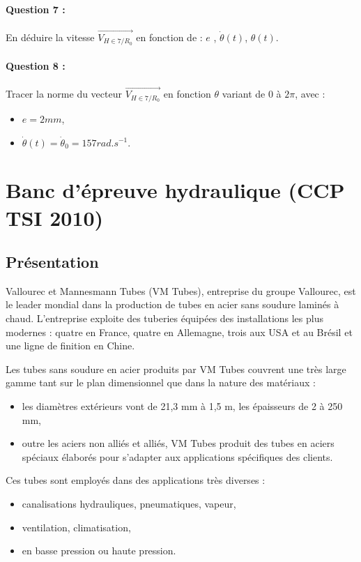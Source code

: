 \paragraph{Question 7 :} En déduire la vitesse $\overrightarrow{V_{H\in 7/R_0}}$ en fonction de : $e$ , $\dot{\theta}(t)$, $\theta(t)$.

\paragraph{Question 8 :} Tracer la norme du vecteur $\overrightarrow{V_{H\in 7/R_0}}$ en fonction $\theta$ variant de $0$ à $2\pi$, avec :
\begin{itemize}
 \item $e=2mm$,
 \item $\dot{\theta}(t)=\dot{\theta}_0=157rad.s^{-1}$.
\end{itemize}

\newpage

\section{Banc d'épreuve hydraulique (CCP TSI 2010)}

\subsection{Présentation}

Vallourec et Mannesmann Tubes (VM Tubes), entreprise du groupe Vallourec, est le leader mondial dans la production de tubes en acier sans soudure laminés à chaud. L'entreprise exploite des tuberies équipées des installations les plus modernes : quatre en France, quatre en Allemagne, trois aux USA et au
Brésil et une ligne de finition en Chine.

Les tubes sans soudure en acier produits par VM Tubes couvrent une très large gamme tant sur le plan dimensionnel que dans la nature des matériaux :
\begin{itemize}
 \item les diamètres extérieurs vont de 21,3 mm à 1,5 m, les épaisseurs de 2 à 250 mm,
 \item outre les aciers non alliés et alliés, VM Tubes produit des tubes en aciers spéciaux élaborés pour s'adapter aux applications spécifiques des clients.
 \end{itemize}

Ces tubes sont employés dans des applications très diverses :
\begin{itemize}
 \item canalisations hydrauliques, pneumatiques, vapeur,
 \item ventilation, climatisation,
 \item en basse pression ou haute pression.
\end{itemize}

